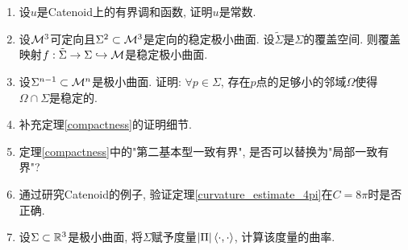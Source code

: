 \begin{enumerate}
    \item 设$u$是Catenoid上的有界调和函数, 证明$u$是常数.
    \item 设${\mathcal{M}}^3$可定向且$\Sigma^2 \subset {\mathcal{M}}^3$是定向的稳定极小曲面. 设$\tilde{\Sigma}$是$\Sigma$的覆盖空间. 则覆盖映射$f:\tilde{\Sigma}\to \Sigma \hookrightarrow {\mathcal{M}}$是稳定极小曲面.
    \item 设$\Sigma^{n-1} \subset {\mathcal{M}}^n$是极小曲面. 证明: $\forall p \in \Sigma$, 存在$p$点的足够小的邻域$\Omega$使得$\Omega \cap \Sigma$是稳定的.
    \item 补充定理\eqref{compactness}的证明细节.
    \item 定理\eqref{compactness}中的"第二基本型一致有界", 是否可以替换为"局部一致有界"?
    \item 通过研究Catenoid的例子, 验证定理\eqref{curvature_estimate_4pi}在$C=8\pi$时是否正确.
    \item 设$\Sigma \subset \mathbb{R}^3$是极小曲面, 将$\Sigma$赋予度量$\left | {\Pi} \right |{\left < \cdot, \cdot \right >}$, 计算该度量的曲率.
\end{enumerate}
